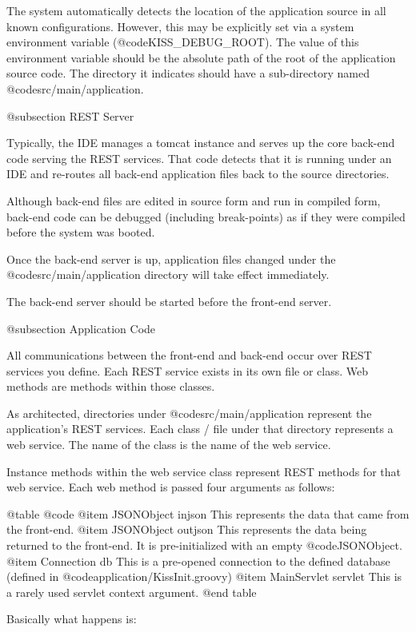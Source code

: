 The system automatically detects the location of the application
source in all known configurations.  However, this may be explicitly
set via a system environment variable (@code{KISS_DEBUG_ROOT}).  The
value of this environment variable should be the absolute path of the
root of the application source code.  The directory it indicates
should have a sub-directory named @code{src/main/application}.



@subsection REST Server

Typically, the IDE manages a tomcat instance and serves up the core
back-end code serving the REST services.  That code detects that it is
running under an IDE and re-routes all back-end application files back
to the source directories.

Although back-end files are edited in source form and run in compiled
form, back-end code can be debugged (including break-points) as if
they were compiled before the system was booted.

Once the back-end server is up, application files changed under the
@code{src/main/application} directory will take effect immediately.

The back-end server should be started before the front-end server.

@subsection Application Code

All communications between the front-end and back-end occur over REST
services you define.  Each REST service exists in its own
file or class.  Web methods are methods within those classes.

As architected, directories under @code{src/main/application}
represent the application's REST services.  Each class / file under that
directory represents a web service.  The name of the class is the name
of the web service.

Instance methods within the web service class represent REST methods
for that web service.  Each web method is passed four arguments as follows:

@table @code
@item JSONObject injson
This represents the data that came from the front-end.
@item JSONObject outjson
This represents the data being returned to the front-end.  It is pre-initialized with an empty @code{JSONObject}.
@item Connection db
This is a pre-opened connection to the defined database (defined in @code{application/KissInit.groovy})
@item MainServlet servlet
This is a rarely used servlet context argument.
@end table

Basically what happens is:

